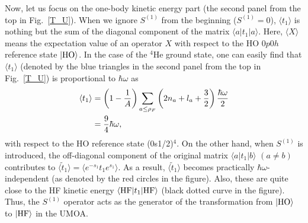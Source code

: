 \documentclass[aps,prc, dvips, twocolumn,groupedaddress,showkeys,showpacs,floatfix,superscriptaddress]{revtex4-1}
\newcommand{\<}{\langle}
\renewcommand{\>}{\rangle}
\begin{document}
Now, let us focus on the one-body kinetic energy part (the second panel from the top in Fig.~\ref{T_U}).
When we ignore $S^{(1)}$ from the beginning ($S^{(1)} = 0$),
 $\<t_{1}\>$ is nothing but the sum of the diagonal component of the matrix $\<a|t_{1}|a\>$.
Here, $\<X \>$ means the expectation value of an operator $X$
 with respect to the HO $0p0h$ reference state $|{\rm HO}\>$.
In the case of the $^4$He ground state,
one can easily find that $\<t_{1}\>$ (denoted by the blue triangles in the second panel from the top in Fig.~\ref{T_U})
 is proportional to $\hbar\omega$ as
\begin{align}
\<t_{1}\> &= \left( 1 - \frac{1}{A}
    \right)\sum_{a \le \rho_{F}} \left( 2n_{a} + l_{a} +
    \frac{3}{2}\right) \frac{\hbar\omega}{2} \notag \\
    \label{eq:one_ho}
    & = \frac{9}{4} \hbar\omega,
\end{align}
with respect to the HO reference state (0s1/2)$^{4}$.
On the other hand, when $S^{(1)}$ is introduced,
 the off-diagonal component of the original matrix $\<a|t_{1}|b\>$ $(a \neq b)$
contributes to $\<\widetilde{t}_{1}\> = \< e^{-s_{1}}t_{1}e^{s_{1}}\>$.
 As a result, $\< \widetilde{t}_{1} \>$ becomes practically $\hbar\omega$-independent
(as denoted by the red circles in the figure).
Also, these are quite close to the HF
 kinetic energy $\<{\rm HF} | t_{1}| {\rm HF}\>$ (black dotted curve in the figure).
Thus, the $S^{(1)}$ operator acts as the generator of the transformation from
$|{\rm HO}\>$ to $|{\rm HF}\>$ in the UMOA.
\end{document}
